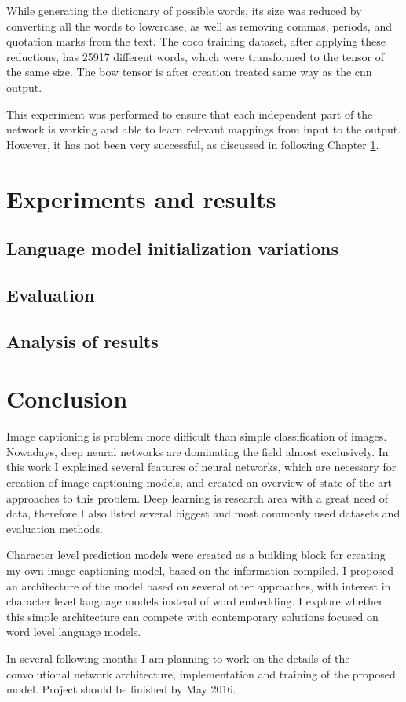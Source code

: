 While generating the dictionary of possible words, its size was reduced by converting all the words to lowercase, as well as removing commas, periods, and quotation marks from the text. The \gls{coco} training dataset, after applying these reductions, has 25917 different words, which were transformed to the tensor of the same size. The \gls{bow} tensor is after creation treated same way as the \gls{cnn} output.

This experiment was performed to ensure that each independent part of the network is working and able to learn relevant mappings from input to the output. However, it has not been very successful, as discussed in following Chapter \ref{chp:experiments}.

\chapter{Experiments and results}\label{chp:experiments}

\section{Language model initialization variations}
\section{Evaluation}
\section{Analysis of results}

\chapter{Conclusion}\label{chp:conclusion}


Image captioning is problem more difficult than simple classification of images. Nowadays, deep neural networks are dominating the field almost exclusively. In this work I explained several features of neural networks, which are necessary for creation of image captioning models, and created an overview of state-of-the-art approaches to this problem. Deep learning is research area with a great need of data, therefore I also listed several biggest and most commonly used datasets and evaluation methods.

Character level prediction models were created as a building block for creating my own image captioning model, based on the information compiled. I proposed an architecture of the model based on several other approaches, with interest in character level language models instead of word embedding. I explore whether this simple architecture can compete with contemporary solutions focused on word level language models.

In several following months I am planning to work on the details of the convolutional network architecture, implementation and training of the proposed model. Project should be finished by May 2016.


